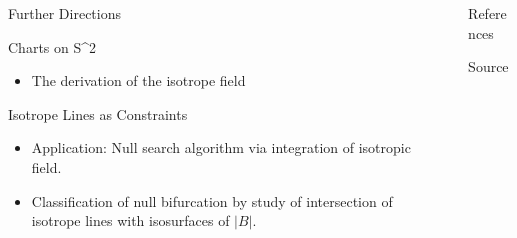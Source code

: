 \documentclass[final]{beamer}
\newlength{\sepwid}
\newlength{\onecolwid}
\newlength{\twocolwid}
\begin{document}
\begin{frame}[t]
\begin{columns}[t]
\begin{column}{\twocolwid}



\begin{columns}[t,totalwidth=\twocolwid]

\begin{column}{\onecolwid} %
\begin{block}{\huge Further Directions}

  \begin{block}{Charts on S^2}
    \begin{itemize}
      \item The derivation of the isotrope field
      \end{itemize}
  \end{block}
  \begin{block}{Isotrope Lines as Constraints}
    \begin{itemize}
      \item Application: Null search algorithm via integration of isotropic field.
      \item Classification of null bifurcation by study of intersection of isotrope lines
        with isosurfaces of $|B|$.
    \end{itemize}
  \end{block}
\end{block}
\end{column}

\begin{column}{\sepwid}\end{column} %

\begin{column}{\onecolwid} %
\begin{block}{\huge References}

\nocite{*} %
\small{
\vspace{0.75in}}

\end{block}

\begin{block}{Source}
\begin{centering}
    \hfill
    \hfill
\end{centering}


\end{block}
\end{column}
\end{columns}
\end{column}
\end{columns}
\end{frame}
\end{document}

